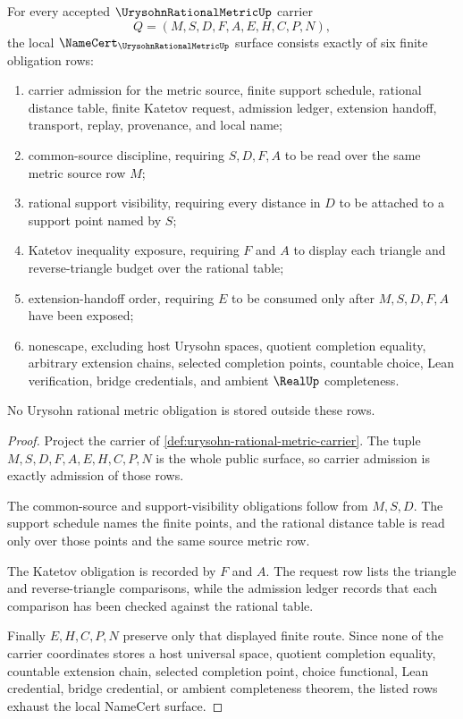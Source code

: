\begin{theorem}
\label{thm:urysohn-rational-metric-namecert-obligations}
For every accepted $\UrysohnRationalMetricUp$ carrier
$$
Q=(M,S,D,F,A,E,H,C,P,N),
$$
the local $\NameCert_{\UrysohnRationalMetricUp}$ surface consists exactly of six finite obligation rows:
\begin{enumerate}
\item carrier admission for the metric source, finite support schedule, rational distance table, finite Katetov request, admission ledger, extension handoff, transport, replay, provenance, and local name;
\item common-source discipline, requiring $S,D,F,A$ to be read over the same metric source row $M$;
\item rational support visibility, requiring every distance in $D$ to be attached to a support point named by $S$;
\item Katetov inequality exposure, requiring $F$ and $A$ to display each triangle and reverse-triangle budget over the rational table;
\item extension-handoff order, requiring $E$ to be consumed only after $M,S,D,F,A$ have been exposed;
\item nonescape, excluding host Urysohn spaces, quotient completion equality, arbitrary extension chains, selected completion points, countable choice, Lean verification, bridge credentials, and ambient $\RealUp$ completeness.
\end{enumerate}
No Urysohn rational metric obligation is stored outside these rows.
\end{theorem}
\begin{proof}
Project the carrier of \autoref{def:urysohn-rational-metric-carrier}. The tuple $M,S,D,F,A,E,H,C,P,N$ is the whole public surface, so carrier admission is exactly admission of those rows.

The common-source and support-visibility obligations follow from $M,S,D$. The support schedule names the finite points, and the rational distance table is read only over those points and the same source metric row.

The Katetov obligation is recorded by $F$ and $A$. The request row lists the triangle and reverse-triangle comparisons, while the admission ledger records that each comparison has been checked against the rational table.

Finally $E,H,C,P,N$ preserve only that displayed finite route. Since none of the carrier coordinates stores a host universal space, quotient completion equality, countable extension chain, selected completion point, choice functional, Lean credential, bridge credential, or ambient completeness theorem, the listed rows exhaust the local NameCert surface.
\end{proof}

